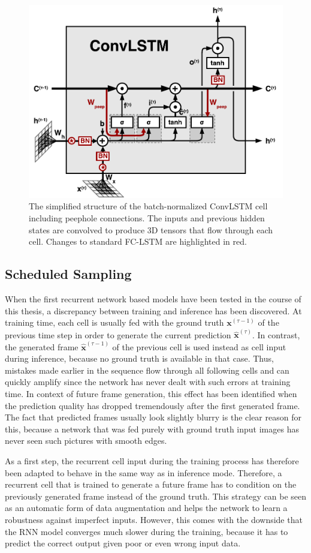 \begin{figure}[htpb]
	\centering
	\includegraphics[width=0.65\linewidth]{figures/convlstm.pdf} 
	\caption[ConvLSTM Cell]{The simplified structure of the batch-normalized ConvLSTM cell including peephole connections. The inputs and previous hidden states are convolved to produce 3D tensors that flow through each cell. Changes to standard FC-LSTM are highlighted in red.} \label{fig:convlstm-cell}
\end{figure}


\subsection{Scheduled Sampling} \label{sec:sched_sample}

When the first recurrent network based models have been tested in the course of this thesis, a discrepancy between training and inference has been discovered. At training time, each cell is usually fed with the ground truth $\textbf{x}^{(\tau-1)}$ of the previous time step in order to generate the current prediction $\hat{\textbf{x}}^{(\tau)}$. In contrast, the generated frame $ \hat{\textbf{x}}^{(\tau-1)}$ of the previous cell is used instead as cell input during inference, because no ground truth is available in that case. Thus, mistakes made earlier in the sequence flow through all following cells and can quickly amplify since the network has never dealt with such errors at training time. In context of future frame generation, this effect has been identified when the prediction quality has dropped tremendously after the first generated frame. The fact that predicted frames usually look slightly blurry is the clear reason for this, because a network that was fed purely with ground truth input images has never seen such pictures with smooth edges.

As a first step, the recurrent cell input during the training process has therefore been adapted to behave in the same way as in inference mode. Therefore, a recurrent cell that is trained to generate a future frame has to condition on the previously generated frame instead of the ground truth. This strategy can be seen as an automatic form of data augmentation and helps the network to learn a robustness against imperfect inputs. However, this comes with the downside that the RNN model converges much slower during the training, because it has to predict the correct output given poor or even wrong input data.

